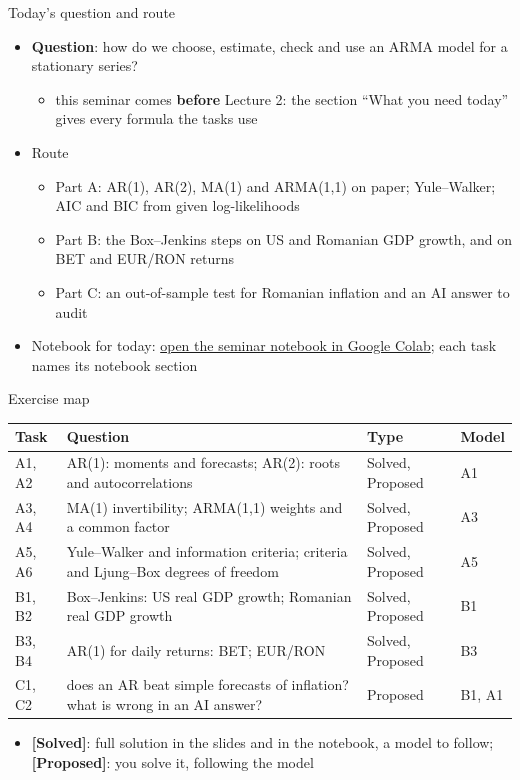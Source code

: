 \begin{frame}{Today's question and route}
\itemsize{\small}
\begin{itemize}
    \item \textbf{Question}: how do we choose, estimate, check and use an ARMA model for a stationary series?
    \begin{itemize}
        \item this seminar comes \textbf{before} Lecture 2: the section ``What you need today'' gives every formula the tasks use
    \end{itemize}
    \item Route
    \begin{itemize}
        \item Part A: AR(1), AR(2), MA(1) and ARMA(1,1) on paper; Yule--Walker; AIC and BIC from given log-likelihoods
        \item Part B: the Box--Jenkins steps on US and Romanian GDP growth, and on BET and EUR/RON returns
        \item Part C: an out-of-sample test for Romanian inflation and an AI answer to audit
    \end{itemize}
    \item Notebook for today: \href{\nb}{open the seminar notebook in Google Colab}; each task names its notebook section
\end{itemize}
\end{frame}

\begin{frame}{Exercise map}
\itemsize{\small}
\begin{center}
\footnotesize
\begin{tabular}{>{\raggedright\arraybackslash}p{1.1cm}>{\raggedright\arraybackslash}p{7.5cm}>{\raggedright\arraybackslash}p{1.9cm}>{\raggedright\arraybackslash}p{1.4cm}}
\toprule
\textbf{Task} & \textbf{Question} & \textbf{Type} & \textbf{Model} \\
\midrule
A1, A2 & AR(1): moments and forecasts; AR(2): roots and autocorrelations & Solved, Proposed & A1 \\
A3, A4 & MA(1) invertibility; ARMA(1,1) weights and a common factor & Solved, Proposed & A3 \\
A5, A6 & Yule--Walker and information criteria; criteria and Ljung--Box degrees of freedom & Solved, Proposed & A5 \\
B1, B2 & Box--Jenkins: US real GDP growth; Romanian real GDP growth & Solved, Proposed & B1 \\
B3, B4 & AR(1) for daily returns: BET; EUR/RON & Solved, Proposed & B3 \\
C1, C2 & does an AR beat simple forecasts of inflation? what is wrong in an AI answer? & Proposed & B1, A1 \\
\bottomrule
\end{tabular}
\end{center}
\begin{itemize}
    \item \textbf{[Solved]}: full solution in the slides and in the notebook, a model to follow; \textbf{[Proposed]}: you solve it, following the model
\end{itemize}
\end{frame}

